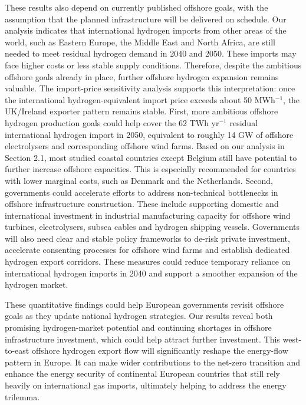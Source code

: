 \documentclass[pdflatex,sn-mathphys,Numbered]{sn-jnl}%
\begin{document}
These results also depend on currently published offshore goals, with the assumption that the planned infrastructure will be delivered on schedule.
Our analysis indicates that international hydrogen imports from other areas of the world, such as Eastern Europe, the Middle East and North Africa, are still needed to meet residual hydrogen demand in 2040 and 2050. These imports may face higher costs or less stable supply conditions. Therefore, despite the ambitious offshore goals already in place, further offshore hydrogen expansion remains valuable.
The import-price sensitivity analysis supports this interpretation: once the international hydrogen-equivalent import price exceeds about 50 \texteuro{} MWh$^{-1}$, the UK/Ireland exporter pattern remains stable.
First, more ambitious offshore hydrogen production goals could help cover the 62 TWh yr$^{-1}$ residual international hydrogen import in 2050, equivalent to roughly 14 GW of offshore electrolysers and corresponding offshore wind farms. Based on our analysis in Section 2.1, most studied coastal countries except Belgium still have potential to further increase offshore capacities. This is especially recommended for countries with lower marginal costs, such as Denmark and the Netherlands.
Second, governments could accelerate efforts to address non-technical bottlenecks in offshore infrastructure construction. These include supporting domestic and international investment in industrial manufacturing capacity for offshore wind turbines, electrolysers, subsea cables and hydrogen shipping vessels. Governments will also need clear and stable policy frameworks to de-risk private investment, accelerate consenting processes for offshore wind farms and establish dedicated hydrogen export corridors. These measures could reduce temporary reliance on international hydrogen imports in 2040 and support a smoother expansion of the hydrogen market.

These quantitative findings could help European governments revisit offshore goals as they update national hydrogen strategies. Our results reveal both promising hydrogen-market potential and continuing shortages in offshore infrastructure investment, which could help attract further investment.
This west-to-east offshore hydrogen export flow will significantly reshape the energy-flow pattern in Europe.
It can make wider contributions to the net-zero transition and enhance the energy security of continental European countries that still rely heavily on international gas imports, ultimately helping to address the energy trilemma.
\end{document}
